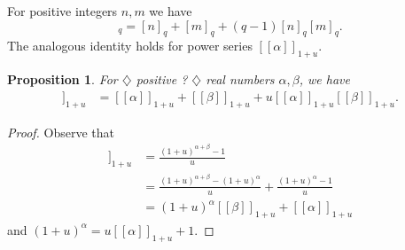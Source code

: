 \documentclass{amsart}
\newtheorem{prop}[thm]{Proposition}
\theoremstyle{definition}
\newcommand{\fanalog}[2]{[\![#2]\!]_{#1}}
\newcommand{\analog}[2]{[#2]_{#1}}
\newcommand{\harry}[1]{{\color{red} \sf $\diamondsuit$  {#1} $\diamondsuit$ }}
\newcommand{\note}[1]{\harry{#1}}
\begin{document}
For positive integers $n,m$ we have
\begin{equation*}
\analog{q}{n + m}
 = \analog{q}{n} + \analog{q}{m} + (q-1) \analog{q}{n} \analog{q}{m} .
\end{equation*}
The analogous identity holds for power series $\fanalog{1 + u}{\alpha}$.
\begin{prop}
For \note{positive ?} real numbers $\alpha,\beta$, we have
\begin{align*}
\fanalog{1 + u}{\alpha + \beta} 
 &= \fanalog{1 + u}{\alpha} + \fanalog{1 + u}{\beta} + u \fanalog{1 + u}{\alpha} \fanalog{1 + u}{\beta} .
\end{align*}
\end{prop}
\begin{proof}
Observe that
\begin{align*}
\fanalog{1 + u}{\alpha + \beta} &= \frac{(1+u)^{\alpha+\beta}-1}{u} \\
&= \frac{(1+u)^{\alpha+\beta}-(1+u)^\alpha}{u} + \frac{(1+u)^{\alpha}-1}{u} \\
&= (1+u)^\alpha \fanalog{1 + u}{\beta} + \fanalog{1 + u}{\alpha} 
\end{align*}
and
$
(1 + u)^\alpha 
= u \fanalog{1 + u}{\alpha} + 1 .
$
\end{proof}
\end{document}
